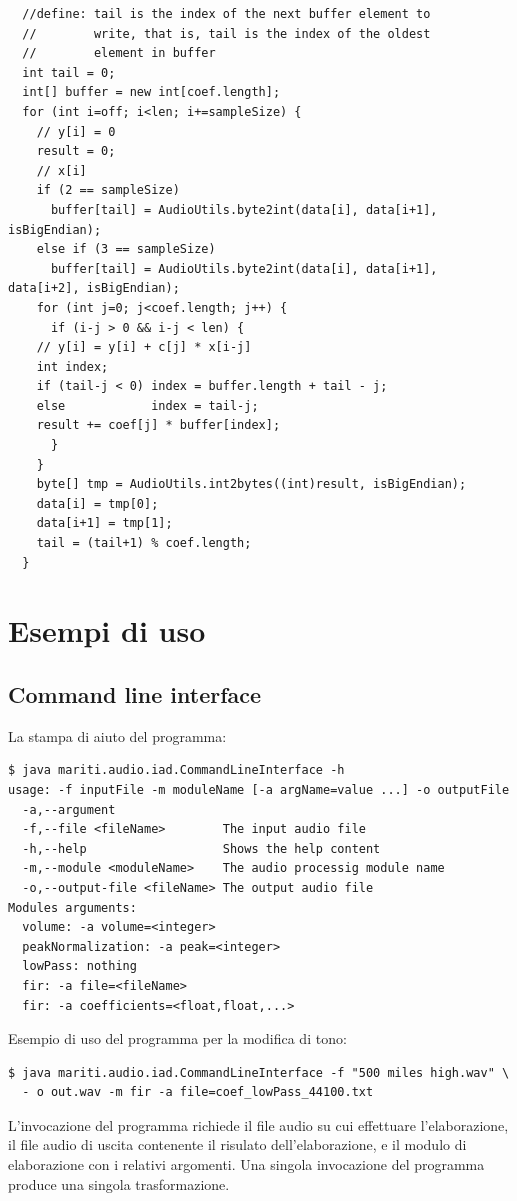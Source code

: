 \documentclass[a4papper]{article}
\begin{document}

\begin{lstlisting}
  //define: tail is the index of the next buffer element to
  //        write, that is, tail is the index of the oldest
  //        element in buffer
  int tail = 0;
  int[] buffer = new int[coef.length];
  for (int i=off; i<len; i+=sampleSize) {
    // y[i] = 0
    result = 0;
    // x[i]
    if (2 == sampleSize) 
      buffer[tail] = AudioUtils.byte2int(data[i], data[i+1], isBigEndian);
    else if (3 == sampleSize)
      buffer[tail] = AudioUtils.byte2int(data[i], data[i+1], data[i+2], isBigEndian);
    for (int j=0; j<coef.length; j++) {
      if (i-j > 0 && i-j < len) {
	// y[i] = y[i] + c[j] * x[i-j]
	int index;
	if (tail-j < 0) index = buffer.length + tail - j;
	else            index = tail-j;
	result += coef[j] * buffer[index];
      }
    }
    byte[] tmp = AudioUtils.int2bytes((int)result, isBigEndian);
    data[i] = tmp[0];
    data[i+1] = tmp[1];
    tail = (tail+1) % coef.length;
  }
\end{lstlisting}
\FloatBarrier

\section{Esempi di uso}
\subsection{Command line interface}
La stampa di aiuto del programma:
\begin{verbatim}
$ java mariti.audio.iad.CommandLineInterface -h
usage: -f inputFile -m moduleName [-a argName=value ...] -o outputFile
  -a,--argument
  -f,--file <fileName>        The input audio file
  -h,--help                   Shows the help content
  -m,--module <moduleName>    The audio processig module name
  -o,--output-file <fileName> The output audio file
Modules arguments:
  volume: -a volume=<integer>
  peakNormalization: -a peak=<integer>
  lowPass: nothing
  fir: -a file=<fileName>
  fir: -a coefficients=<float,float,...>
\end{verbatim}
Esempio di uso del programma per la modifica di tono:
\begin{verbatim}
$ java mariti.audio.iad.CommandLineInterface -f "500 miles high.wav" \
  - o out.wav -m fir -a file=coef_lowPass_44100.txt
\end{verbatim}
L'invocazione del programma richiede il file audio su cui effettuare
l'elaborazione, il file audio di uscita contenente il risulato
dell'elaborazione, e il modulo di elaborazione con i relativi
argomenti. Una singola invocazione del programma produce una singola
trasformazione.
\end{document}
